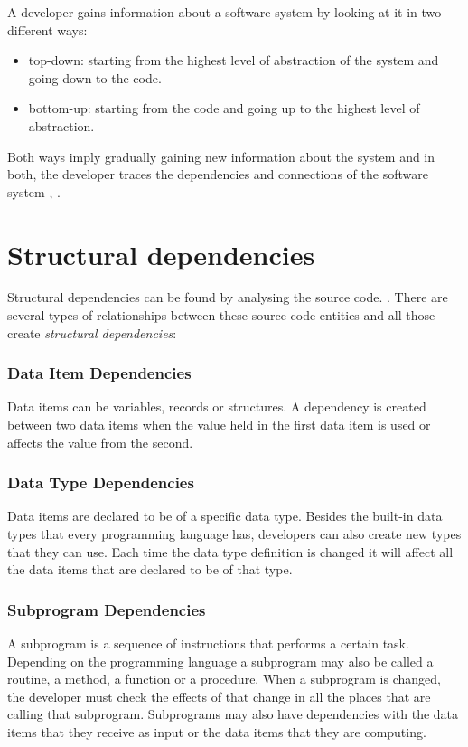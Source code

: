 \documentclass[12pt]{mitthesis}
\begin{document}
A developer gains information about a software system by looking at it in two different ways: 
\begin{itemize}
	\item top-down: starting from the highest level of abstraction of the system and going down to the code.
	\item bottom-up: starting from the code and going up to the highest level of abstraction.
\end{itemize}

Both ways imply gradually gaining new information about the system and in both, the developer traces the dependencies and connections of the software system \cite{Wilde90understandingprogram}, \cite{341244}.

\section{Structural dependencies}
Structural dependencies can be found by analysing the source code. \cite{Sangal:2005:UDM:1094811.1094824}. 
There are several types of relationships between these source code entities and all those create \textit{structural dependencies}:

\subsubsection{Data Item Dependencies}
Data items can be variables, records or structures. A dependency is created between two data items when the value held in the first data item is used or affects the value from the second.

\subsubsection{Data Type Dependencies}
Data items are declared to be of a specific data type. Besides the built-in data types that every programming language has, developers can also create new types that they can use. Each time the data type definition is changed it will affect all the data items that are declared to be of that type. 

\subsubsection{Subprogram Dependencies}
A subprogram is a sequence of instructions that performs a certain task. Depending on the programming language a subprogram may also be called a routine, a method, a function or a procedure. When a subprogram is changed, the developer must check the effects of that change in all the places that are calling that subprogram. Subprograms may also have dependencies with the data items that they receive as input or the data items that they are computing.
\end{document}
